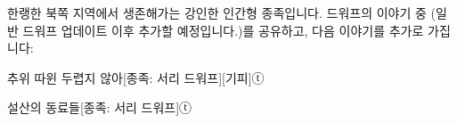 \documentclass{report}
\begin{document}
	한랭한 북쪽 지역에서 생존해가는 강인한 인간형 종족입니다. 드워프의 이야기 중 (일반 드워프 업데이트 이후 추가할 예정입니다.)를 공유하고, 다음 이야기를 추가로 가집니다:
	
	\begin{story}{추위 따윈 두렵지 않아}{[종족: 서리 드워프][기피]ⓣ}
		
		
	\end{story}
	
	\begin{story}{설산의 동료들}{[종족: 서리 드워프]ⓣ}
		
	\end{story}
\end{document}
